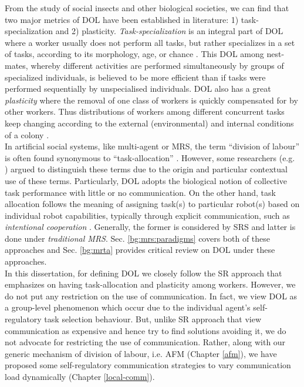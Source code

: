 From the study of social insects and other biological societies, we can find that two major metrics of DOL have been established in literature: 1) task-specialization and 2) plasticity. {\em Task-specialization} is an integral part of DOL where a worker usually does not perform all tasks, but rather specializes in a set of tasks, according to its morphology, age, or chance \cite{Bonabeau+1999}. This DOL among nest-mates, whereby different activities are performed simultaneously by groups of specialized individuals, is believed to be more efficient than if tasks were performed sequentially by unspecialised individuals. DOL also has a great {\em plasticity} where the removal of one class of workers is quickly compensated for by other workers. Thus distributions of workers among different concurrent tasks keep changing according to the external (environmental) and internal conditions of a colony \cite{Garnier+2007}.\\
In artificial social systems, like multi-agent or MRS, the term ``division of labour'' is often found synonymous to ``task-allocation'' \cite{Shen+2001}. However, some researchers (e.g. \cite{Labella2007}) argued to distinguish these terms due to the origin and particular contextual use of these terms. Particularly, DOL adopts the biological notion of collective task performance with little or no communication. On the other hand, task allocation follows the meaning of assigning task(s) to particular robot(s) based on individual robot capabilities, typically through explicit communication, such as {\em intentional cooperation} \cite{Parker1998}. Generally, the former is considered by \acf{SRS} and latter is done under {\em traditional MRS}. Sec. \ref{bg:mrs:paradigms} covers both of these approaches and Sec. \ref{bg:mrta} provides critical review on DOL under these approaches.\\
In this dissertation, for defining DOL we closely follow the SR approach that emphasizes on having task-allocation and plasticity among workers. However, we do not put any restriction on the use of communication. In fact, we view DOL as a group-level phenomenon which occur due to the individual agent's self-regulatory task selection behaviour. But, unlike SR approach that view communication as expensive and hence try to find solutions avoiding it, we do not advocate for restricting the use of communication. Rather,  along with our generic mechanism of division of labour, i.e. AFM (Chapter \ref{afm}), we have proposed some self-regulatory communication strategies to vary communication load dynamically (Chapter \ref{local-comm}). 
